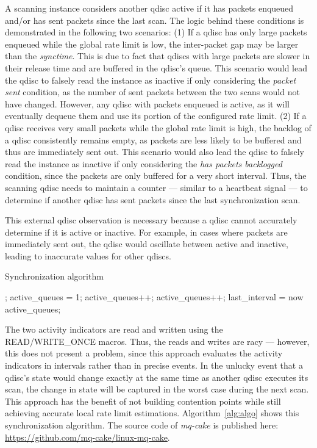 A scanning instance considers another qdisc active if it has packets enqueued and/or has sent packets since the last scan.
%
The logic behind these conditions is demonstrated in the following two scenarios:
%
(1) If a qdisc has only large packets enqueued while the global rate limit is low, the inter-packet gap may be larger than the \textit{synctime}.
This is due to fact that qdiscs with large packets are slower in their release time and are buffered in the qdisc's queue.
%
This scenario would lead the qdisc to falsely read the instance as inactive if only considering the \textit{packet sent} condition, as the number of sent packets between the two scans  would not have changed.
%
However, any qdisc with packets enqueued is active, as it will eventually dequeue them and use its portion of the configured rate limit.
%
(2) If a qdisc receives very small packets while the global rate limit is high, the backlog of a qdisc consistently remains empty, as packets are less likely to be buffered and thus are immediately sent out.
%
This scenario would also lead the qdisc to falsely read the instance as inactive if only considering the \textit{has packets backlogged} condition, since the packets are only buffered for a very short interval.
%
Thus, the scanning qdisc needs to maintain a counter --- similar to a heartbeat signal --- to determine if another qdisc has sent packets since the last synchronization scan.
%

This external qdisc observation is necessary because a qdisc cannot accurately determine if it is active or inactive.
%
For example, in cases where packets are immediately sent out, the qdisc would oscillate between active and inactive, leading to inaccurate values for other qdiscs. 
%

\begin{algorithm}[t]
    \caption{Synchronization algorithm}\label{alg:algo}
\begin{algorithmic}[1]
    \State {};
\EndIf
\State active\_queues = 1;
    \State active\_queues++;
    \State active\_queues++;
    \EndIf
\EndFor
\State last\_interval = now
\State \Return active\_queues;
\EndProcedure
\end{algorithmic}
\end{algorithm}
The two activity indicators are read and written using the READ/WRITE\_ONCE macros.
%
Thus, the reads and writes are racy --- however, this does not present a problem, since this approach evaluates the activity indicators in intervals rather than in precise events.
%
In the unlucky event that a qdisc's state would change exactly at the same time as another qdisc executes its scan, the change in state will be captured in the worst case during the next scan.
%
This approach has the benefit of not building contention points while still achieving accurate local rate limit estimations.
%
Algorithm~\ref{alg:algo} shows this synchronization algorithm.
%
The source code of \textit{mq-cake} is published here: \url{https://github.com/mq-cake/linux-mq-cake}.

